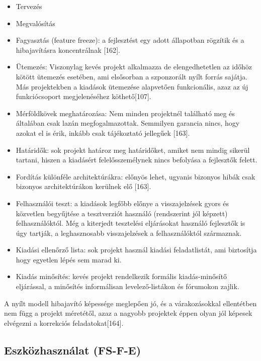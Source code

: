 \documentclass[12pt,magyar,a4paper,oneside]{scrreprt}
\providecommand{\tightlist}{%
  \setlength{\itemsep}{0pt}\setlength{\parskip}{0pt}}
\begin{document}
\begin{itemize}
\tightlist
\item
  Tervezés
\item
  Megvalósítás
\item
  Fagyasztás (feature freeze): a fejlesztést egy adott állapotban
  rögzítik és a hibajavításra koncentrálnak {[}162{]}.
\item
  Ütemezés: Viszonylag kevés projekt alkalmazza de elengedhetetlen az
  időhöz kötött ütemezés esetében, ami elsősorban a szponzorált nyílt
  forrás sajátja. Más projektekben a kiadások ütemezése alapvetően
  funkcionális, azaz az új funkciócsoport megjelenéséhez
  köthető{[}107{]}.
\item
  Mérföldkövek meghatározása: Nem minden projektnél található meg és
  általában csak lazán megfogalmazottak. Semmilyen garancia nincs, hogy
  azokat el is érik, inkább csak tájékoztató jellegűek {[}163{]}.
\item
  Határidők: sok projekt határoz meg határidőket, amiket nem mindig
  sikerül tartani, hiszen a kiadásért felelősszemélynek nincs befolyása
  a fejlesztők felett.
\item
  Fordítás különféle architektúrákra: előnyös lehet, ugyanis bizonyos
  hibák csak bizonyos architektúrákon kerülnek elő {[}163{]}.
\item
  Felhasználói teszt: a kiadások legfőbb előnye a visszajelzések gyors
  és közvetlen begyűjtése a tesztverziót használó (rendszerint jól
  képzett) felhasználóktól. Még a kiterjedt tesztelési eljárásokat
  használó fejlesztők is úgy tartják, a leghasznosabb visszajelzések a
  felhasználóktól származnak.
\item
  Kiadási ellenőrző lista: sok projekt használ kiadási feladatlistát,
  ami biztosítja hogy egyetlen lépés sem marad ki.
\item
  Kiadás minősítés: kevés projekt rendelkezik formális kiadás-minősítő
  eljárással, a minősítés informálisan levelező-listákon és fórumokon
  zajlik.
\end{itemize}

A nyílt modell hibajavító képessége meglepően jó, és a várakozásokkal
ellentétben nem függ a projekt méretétől, azaz a nagyobb projektek éppen
olyan jól képesek elvégezni a korrekciós feladatokat{[}164{]}.

\hypertarget{sec:FS-F-E}{%
\subsection{Eszközhasználat (FS-F-E)}\label{sec:FS-F-E}}
\end{document}
